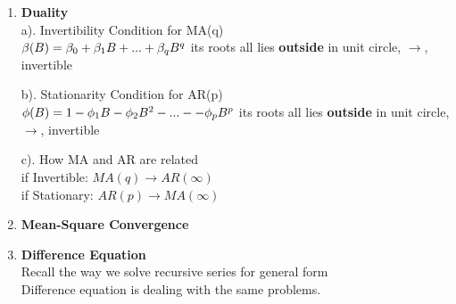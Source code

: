 \documentclass[10pt,landscape]{article}
\begin{document}
\begin{multicols}{3}
\begin{enumerate}
  \item \textbf{Duality}\\
  		a). Invertibility Condition for MA(q)\\
  		$
  		\beta(B) = \beta_0 + \beta_1B + ... + \beta_qB^q\\
  		$
  		its roots all lies \textbf{outside}  in unit circle, $\rightarrow$, invertible
  		
  		b). Stationarity Condition for AR(p)\\
  		$
  		\phi(B) = 1-\phi_1B -\phi_2B^2 - ... - -\phi_pB^p\\
  		$
  		its roots all lies \textbf{outside}  in unit circle, $\rightarrow$, invertible
  		
  		c). How MA and AR are related\\
  		if Invertible: $MA(q) \longrightarrow AR(\infty)$\\
  		if Stationary: $AR(p) \longrightarrow MA(\infty)$
  		
  \item \textbf{Mean-Square Convergence}
  \item \textbf{Difference Equation}\\
  		Recall the way we solve recursive series for general form\\
  		Difference equation is dealing with the same problems.\\
  		

\end{enumerate}
\end{multicols}
\end{document}
